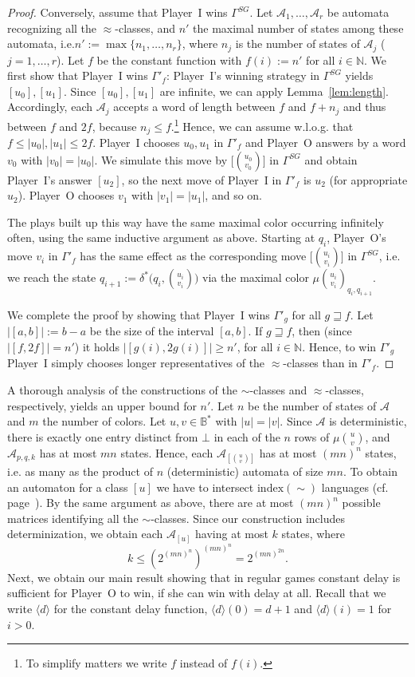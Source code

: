 \documentclass[fleqn,envcountsame]{LMCS}
\newcommand{\aut}[1]{\ensuremath{\mathcal{#1}}}
\newcommand{\pI}{Player~I\xspace}
\newcommand{\pO}{Player~O\xspace}
\newcommand{\GSG}{\ensuremath{\Gamma^{SG}}\xspace}
\newcommand{\Gp}[1]{\ensuremath{\Gamma'_{#1}}\xspace}
\newcommand{\const}[1]{\ensuremath{\langle#1\rangle}\xspace}
\newcommand{\Nat}{\ensuremath{\mathbb{N}}\xspace}
\newcommand{\Bst}{\ensuremath{\mathbb{B}^*}\xspace}
\newcommand{\ie}{i.e.\xspace}
\newcommand{\cf}{cf.\xspace}
\newcommand{\wlofg}{w.l.o.g.\xspace}
\newcommand{\Index}{\mathrm{index}}
\let\obinom\binom
\renewcommand\binom[2]{
  \Big( { {{#1}} \atop {{#2}} } \Big)
}
\begin{document}
\begin{proof}
Conversely, assume that \pI wins \GSG. Let
$\aut{A}_1,\ldots,\aut{A}_r$ be automata recognizing all the
$\approx$-classes, and $n'$ the maximal number of states among these
automata, \ie $n':=\max\{n_1,\ldots,n_r\}$, where $n_j$ is the number of states of $\aut{A}_j$ ($j=1,\ldots,r$).
Let $f$ be the constant function with $f(i):=n'$ for all $i\in\Nat$.
We first show that \pI wins \Gp{f}:
\pI's winning strategy in \GSG yields $[u_0],[u_1]$.
Since $[u_0],[u_1]$ are infinite, we can apply Lemma~\ref{lem:length}.
Accordingly, each $\aut{A}_j$ accepts a word of length between $f$ and
$f+n_j$ and thus between $f$ and $2f$, because $n_j\leq f$.\footnote{To simplify matters we write $f$ instead of $f(i)$.}
Hence, we can assume \wlofg that $f\leq|u_0|,|u_1|\leq2f$.
\pI chooses $u_0,u_1$ in \Gp{f} and \pO answers by a word $v_0$ with
$|v_0|=|u_0|$. We simulate this move by $\big[\obinom{u_0}{v_0}\big]$ in \GSG
and obtain \pI's answer $[u_2]$, so the next move of \pI in \Gp{f} is
$u_2$ (for appropriate $u_2$). \pO chooses $v_1$ with $|v_1|=|u_1|$,
and so on.

The plays built up this way have the same maximal color occurring
infinitely often, using the same inductive argument as above. Starting
at $q_i$, \pO's move $v_i$ in \Gp{f} has the same effect as the
corresponding move $\big[\obinom{u_i}{v_i}\big]$ in \GSG, \ie we reach
the state $q_{i+1}:=\delta^*\big(q_i,\obinom{u_i}{v_i}\big)$ via
the maximal color $\mu\obinom{u_i}{v_i}_{q_i,q_{i+1}}$.

We complete the proof by showing that \pI wins \Gp{g} for all $g\sqsupseteq f$.
Let $|[a,b]|:=b-a$ be the size of the interval
$[a,b]$. If $g\sqsupseteq f$, then (since $|[f,2f]|=n'$) it holds
$|[g(i),2g(i)]|\geq n'$, for all $i\in\Nat$. Hence, to win \Gp{g} \pI
simply chooses longer representatives of the $\approx$-classes than in
\Gp{f}.
\end{proof}

A thorough analysis of the constructions of the $\sim$-classes and
$\approx$-classes, respectively, yields an upper bound for $n'$. Let
$n$ be the number of states of \aut{A} and $m$ the number of
colors. Let $u,v\in\Bst$ with $|u|=|v|$. Since \aut{A} is deterministic,
there is exactly one entry distinct from $\bot$ in each of the $n$
rows of $\mu\obinom{u}{v}$, and $\aut{A}_{p,q,k}$ has at most $mn$
states. Hence, each $\aut{A}_{[\obinom{u}{v}]}$ has at most $(mn)^n$
states, \ie as many as the product of $n$ (deterministic) automata
of size $mn$. To obtain an automaton for a class $[u]$ we have to intersect
$\Index(\sim)$ languages (\cf page~\pageref{pageref:definition_L_A_u}).
By the same argument as above, there are at most $(mn)^n$ possible
matrices identifying all the $\sim$-classes. Since our construction
includes determinization, we obtain each $\aut{A}_{[u]}$ having
at most $k$ states, where
\[ k\leq(2^{(mn)^{n}})^{(mn)^n}=2^{(mn)^{2n}}. \]
Next, we obtain our main result showing that in regular games constant delay
is sufficient for \pO to win, if she can win with delay at all.
Recall that we write $\const{d}$ for the constant delay function,
$\const{d}(0)=d+1$ and $\const{d}(i)=1$ for $i>0$.
\end{document}
